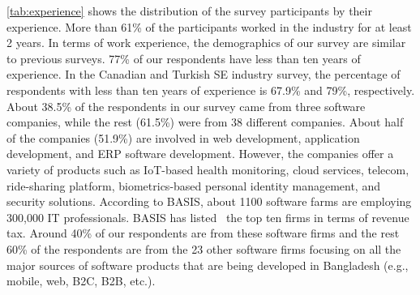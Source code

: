 \tbl\ref{tab:experience} shows the distribution of the survey participants by
their experience. More than 61\% of the participants worked in the industry for
at least 2 years. In terms of work experience, the demographics of our survey
are similar to previous surveys. 77\% of our respondents have less than ten
years of experience. In the Canadian and Turkish SE industry survey, the
percentage of respondents with less than ten years of experience is 67.9\% and 
79\%, respectively. About 38.5\% of the respondents in our survey came from
three software companies, while the rest (61.5\%) were from 38 different
companies. About half of the companies (51.9\%) are involved in web development,
application development, and ERP software development.
However, the companies offer a variety of products such as IoT-based health
monitoring, cloud services, telecom, ride-sharing platform, biometrics-based
personal identity management, and security solutions. According to BASIS, about
1100 software farms are employing 300,000 IT professionals. BASIS has
listed~\citep{BASISList} the top ten firms in terms of revenue tax. Around 40\% of our
respondents are from these software firms and the rest 60\% of the respondents are from the 23 other software firms focusing on 
all the major sources of software products that are being developed in Bangladesh (e.g., mobile, web, B2C, B2B, etc.). 
% 
% 

% 

